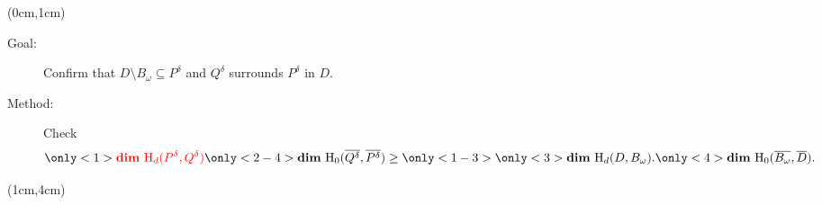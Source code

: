 \begin{frame}
  \begin{textblock*}{12cm}(0cm,1cm)
    \begin{small}
    \begin{description}
      \item[Goal:] Confirm that $D\setminus B_\omega\subseteq P^\delta$ and $Q^\delta$ surrounds $P^\delta$ in $D$.
      \item[Method:] Check
      \[%
        \only<1>{{\color{red}\mathbf{dim}~\hom_d(P^\delta, Q^\delta)}} %
        \only<2-4>{\mathbf{dim}~\hom_0(\overline{Q^\delta},\overline{P^\delta})}\geq%
        \only<1-3>{{\only<3>{\color{red}}\mathbf{dim}~\hom_d(D, B_\omega).}}%
        \only<4>{\mathbf{dim}~\hom_0(\overline{B_\omega},\overline{D}).}%
      \]
    \end{description}
    \end{small}
  \end{textblock*}

  \begin{textblock*}{11cm}(1cm,4cm)
  \end{textblock*}



\end{frame}
